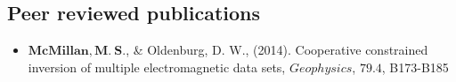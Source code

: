 \documentclass[letterpaper,11pt]{article}
\begin{document}
\subsection{Peer reviewed publications}
\begin{itemize}
\item
$\mathbf{McMillan, M. \ S.}$, \& Oldenburg, D. W., (2014). Cooperative constrained inversion of multiple electromagnetic data sets, $\mathit Geophysics$, $ \mathbf{79.4} $, B173-B185


\end{itemize}


\newpage


\end{document}
